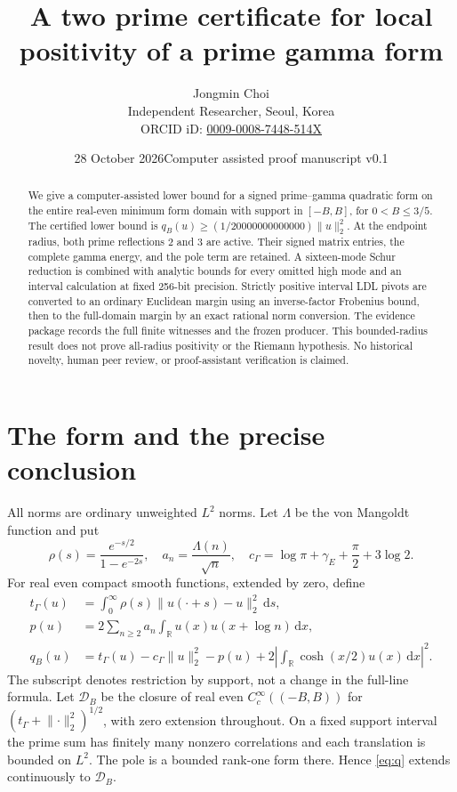 \documentclass[11pt]{article}
\title{A two prime certificate for local positivity of a prime gamma form}
\author{Jongmin Choi\\Independent Researcher, Seoul, Korea\\ORCID iD: \href{https://orcid.org/0009-0008-7448-514X}{0009-0008-7448-514X}}
\date{28 October 2026\quad Computer assisted proof manuscript v0.1}
\newcommand{\R}{\mathbb R}
\newcommand{\dd}{\,\mathrm d}
\newcommand{\norm}[1]{\lVert#1\rVert}
\begin{document}
\maketitle
\begin{abstract}
We give a computer-assisted lower bound for a signed prime--gamma quadratic form on the entire real-even minimum form domain with support in $[-B,B]$, for $0<B\le3/5$. The certified lower bound is $q_B(u)\ge(1/20000000000000)\norm u_2^2$. At the endpoint radius, both prime reflections $2$ and $3$ are active. Their signed matrix entries, the complete gamma energy, and the pole term are retained. A sixteen-mode Schur reduction is combined with analytic bounds for every omitted high mode and an interval calculation at fixed 256-bit precision. Strictly positive interval LDL pivots are converted to an ordinary Euclidean margin using an inverse-factor Frobenius bound, then to the full-domain margin by an exact rational norm conversion. The evidence package records the full finite witnesses and the frozen producer. This bounded-radius result does not prove all-radius positivity or the Riemann hypothesis. No historical novelty, human peer review, or proof-assistant verification is claimed.
\end{abstract}

\section{The form and the precise conclusion}
All norms are ordinary unweighted $L^2$ norms. Let $\Lambda$ be the von Mangoldt function and put
\[
 \rho(s)=\frac{e^{-s/2}}{1-e^{-2s}},\quad a_n=\frac{\Lambda(n)}{\sqrt n},\quad
 c_\Gamma=\log\pi+\gamma_E+\frac\pi2+3\log2.
\]
For real even compact smooth functions, extended by zero, define
\begin{align}
 t_\Gamma(u)&=\int_0^\infty\rho(s)\norm{u(\cdot+s)-u}_2^2\dd s,\label{eq:gamma}\\
 p(u)&=2\sum_{n\ge2}a_n\int_\R u(x)u(x+\log n)\dd x,\nonumber\\
 q_B(u)&=t_\Gamma(u)-c_\Gamma\norm u_2^2-p(u)
       +2\left|\int_\R\cosh(x/2)u(x)\dd x\right|^2.\label{eq:q}
\end{align}
The subscript denotes restriction by support, not a change in the full-line formula. Let $\mathcal D_B$ be the closure of real even $C_c^\infty((-B,B))$ for $(t_\Gamma+\norm{\cdot}_2^2)^{1/2}$, with zero extension throughout. On a fixed support interval the prime sum has finitely many nonzero correlations and each translation is bounded on $L^2$. The pole is a bounded rank-one form there. Hence \eqref{eq:q} extends continuously to $\mathcal D_B$.
\end{document}
